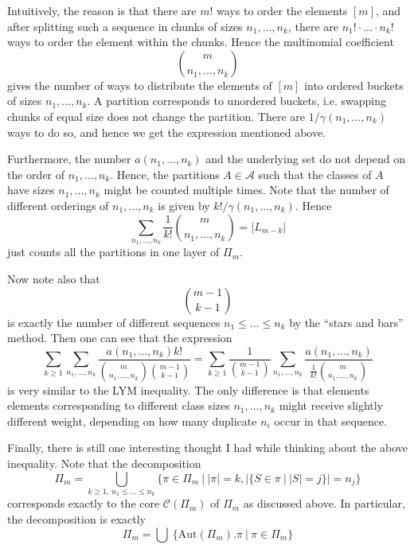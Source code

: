 \documentclass{scrartcl}
\theoremstyle{definition}
\begin{document}
Intuitively, the reason is that there are $m!$ ways to order the elements $[m]$, and after splitting such a sequence in chunks of sizes $n_1, ..., n_k$, there are $n_1! \cdot ... \cdot n_k!$ ways to order the element within the chunks.
Hence the multinomial coefficient
\begin{equation*}
    {m \choose n_1, ..., n_k}
\end{equation*}
gives the number of ways to distribute the elements of $[m]$ into ordered buckets of sizes $n_1, ..., n_k$.
A partition corresponds to unordered buckets, i.e. swapping chunks of equal size does not change the partition.
There are $1/\gamma(n_1, ..., n_k)$ ways to do so, and hence we get the expression mentioned above.

Furthermore, the number $a(n_1, ..., n_k)$ and the underlying set do not depend on the order of $n_1, ..., n_k$.
Hence, the partitions $A \in \mathcal{A}$ such that the classes of $A$ have sizes $n_1, ..., n_k$ might be counted multiple times.
Note that the number of different orderings of $n_1, ..., n_k$ is given by $k!/\gamma(n_1, ..., n_k)$.
Hence
\begin{equation*}
    \sum_{n_1, ..., n_k} \frac 1 {k!} {m \choose n_1, ..., n_k} = |L_{m - k}|
\end{equation*}
just counts all the partitions in one layer of $\Pi_m$.

Now note also that
\begin{equation*}
    {m - 1 \choose k - 1}
\end{equation*}
is exactly the number of different sequences $n_1 \leq ... \leq n_k$ by the ``stars and bars'' method.
Then one can see that the expression
\begin{equation*}    
    \sum_{k \geq 1} \sum_{n_1, ..., n_k} \frac {a(n_1, ..., n_k) k!} {{m \choose n_1, ..., n_k} {m - 1 \choose k - 1}} = \sum_{k \geq 1} \frac 1 {{m - 1 \choose k - 1}} \sum_{n_1, ..., n_k} \frac {a(n_1, ..., n_k)} {\frac 1 {k!} {m \choose n_1, ..., n_k}}
\end{equation*}
is very similar to the LYM inequality.
The only difference is that elements elements corresponding to different class sizes $n_1, ..., n_k$ might receive slightly different weight, depending on how many duplicate $n_i$ occur in that sequence.

Finally, there is still one interesting thought I had while thinking about the above inequality.
Note that the decomposition
\begin{equation*}
    \Pi_m = \bigcup_{k \geq 1, \ n_1 \leq ... \leq n_k} \{ \pi \in \Pi_m \ | \ |\pi| = k, |\{ S \in \pi \ | \ |S| = j \}| = n_j \}
\end{equation*}
corresponds exactly to the core $\mathcal{C}(\Pi_m)$ of $\Pi_m$ as discussed above.
In particular, the decomposition is exactly
\begin{equation*}
    \Pi_m = \bigcup \ \{ \mathrm{Aut}(\Pi_m).\pi \ | \ \pi \in \Pi_m \}
\end{equation*}
\end{document}
